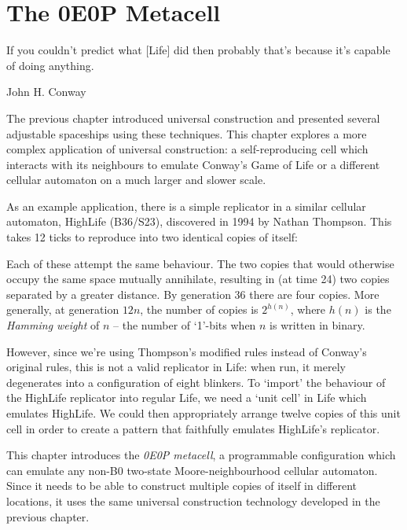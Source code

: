 
\renewcommand{\chapterfolder}{0e0p/}
\chapter{The 0E0P Metacell}\label{chp:0e0p}


\vspace*{-0.4in}
\epigraph{If you couldn't predict what [Life] did then probably that's because it's capable of doing anything.}{John H. Conway}
\vspace*{0.4in}


\noindent The previous chapter introduced universal construction and presented
several adjustable spaceships using these techniques. This chapter explores a
more complex application of universal construction: a self-reproducing cell
which interacts with its neighbours to emulate Conway's Game of Life or a
different cellular automaton on a much larger and slower scale.

As an example application, there is a simple replicator in a similar cellular
automaton, HighLife (B36/S23), discovered in 1994 by Nathan Thompson. This
takes 12 ticks to reproduce into two identical copies of itself:


Each of these attempt the same behaviour. The two copies that would otherwise
occupy the same space mutually annihilate, resulting in (at time 24) two copies
separated by a greater distance. By generation 36 there are four copies. More
generally, at generation $12n$, the number of copies is $2^{h(n)}$, where
$h(n)$ is the \emph{Hamming weight} of $n$ -- the number of `1'-bits when $n$
is written in binary.

However, since we're using Thompson's modified rules instead of Conway's
original rules, this is not a valid replicator in Life: when run, it merely
degenerates into a configuration of eight blinkers. To `import' the behaviour
of the HighLife replicator into regular Life, we need a `unit cell' in Life
which emulates HighLife. We could then appropriately arrange twelve copies of
this unit cell in order to create a pattern that faithfully emulates
HighLife's replicator.

This chapter introduces the \emph{0E0P metacell}, a programmable configuration
which can emulate any non-B0 two-state Moore-neighbourhood cellular automaton.
Since it needs to be able to construct multiple copies of itself in different
locations, it uses the same universal construction technology developed in
the previous chapter.


